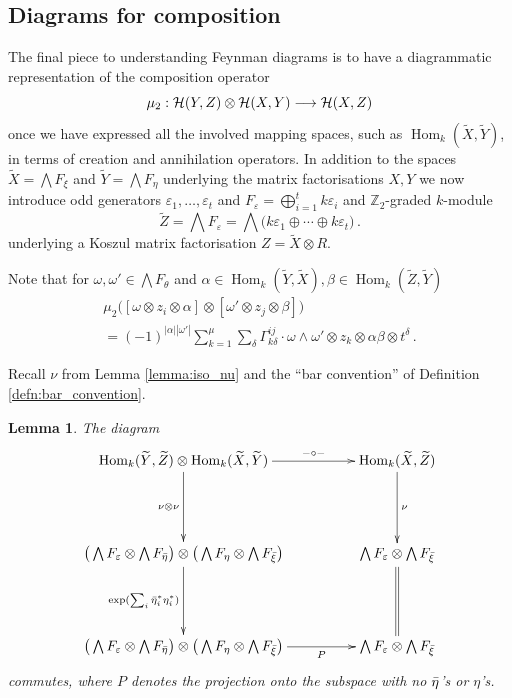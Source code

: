 \documentclass[english,letter paper,12pt,leqno]{article}
\newtheorem{lemma}[theorem]{Lemma}
\theoremstyle{example}
\numberwithin{equation}{section}
\def\HH{\HH}
\def\HH{\mathcal{H}}
\def\Hom{\operatorname{Hom}}
\def\be{\begin{equation}}
\def\ee{\end{equation}}
\def\nZ{\mathds{Z}}
\begin{document}
\subsection{Diagrams for composition}\label{section:feynman_diagram_3}

The final piece to understanding Feynman diagrams is to have a diagrammatic representation of the composition operator
\[
\mu_2: \HH(Y, Z) \otimes \HH(X, Y) \lto \HH(X,Z)
\]
once we have expressed all the involved mapping spaces, such as $\Hom_k(\widetilde{X}, \widetilde{Y})$, in terms of creation and annihilation operators. In addition to the spaces $\widetilde{X} = \bigwedge F_\xi$ and $\widetilde{Y} = \bigwedge F_\eta$ underlying the matrix factorisations $X,Y$ we now introduce odd generators $\varepsilon_1,\ldots,\varepsilon_t$ and $F_\varepsilon = \bigoplus_{i=1}^t k \varepsilon_i$ and $\nZ_2$-graded $k$-module
\be
\widetilde{Z} = \bigwedge F_\varepsilon = \bigwedge\big( k \varepsilon_1 \oplus \cdots \oplus k \varepsilon_t \big)\,.
\ee
underlying a Koszul matrix factorisation $Z = \widetilde{X} \otimes R$. 

Note that for $\omega, \omega' \in \bigwedge F_\theta$ and $\alpha \in \Hom_k(\widetilde{Y}, \widetilde{X}), \beta \in \Hom_k(\widetilde{Z}, \widetilde{Y})$
\begin{gather*}
\mu_2\Big( [ \omega \otimes z_i \otimes \alpha ] \otimes [ \omega' \otimes z_j \otimes \beta ] \Big) \\
= (-1)^{|\alpha||\omega'|} \sum_{k=1}^\mu \sum_{\delta} \Gamma^{ij}_{k \delta} \cdot \omega \wedge \omega' \otimes z_k \otimes \alpha \beta \otimes t^{\delta}\,.
\end{gather*}


Recall $\nu$ from Lemma \ref{lemma:iso_nu} and the ``bar convention'' of Definition \ref{defn:bar_convention}.

\begin{lemma}\label{lemma:mixedr2_0} The diagram
\be
\xymatrix@C+2pc@R+2pc{
\Hom_k( \widetilde{Y}, \widetilde{Z} ) \otimes \Hom_k( \widetilde{X}, \widetilde{Y} ) \ar[d]_-{\nu \otimes \nu} \ar[r]^-{- \circ -} & \Hom_k( \widetilde{X}, \widetilde{Z} ) \ar[d]^-\nu\\
\big( \bigwedge F_\varepsilon \otimes \bigwedge F_{\Bar{\eta}} \big) \otimes \big( \bigwedge F_\eta \otimes \bigwedge F_{\Bar{\xi}} \big) \ar[d]_-{\exp( \sum_i \Bar{\eta}_i^* \eta_i^* )} & \bigwedge F_\varepsilon \otimes \bigwedge F_{\Bar{\xi}} \ar@{=}[d]\\
\big( \bigwedge F_\varepsilon \otimes \bigwedge F_{\Bar{\eta}} \big) \otimes \big( \bigwedge F_\eta \otimes \bigwedge F_{\Bar{\xi}} \big) \ar[r]_-P & \bigwedge F_\varepsilon \otimes \bigwedge F_{\Bar{\xi}}
}
\ee
commutes, where $P$ denotes the projection onto the subspace with no $\Bar{\eta}$'s or $\eta$'s.
\end{lemma}
\end{document}
